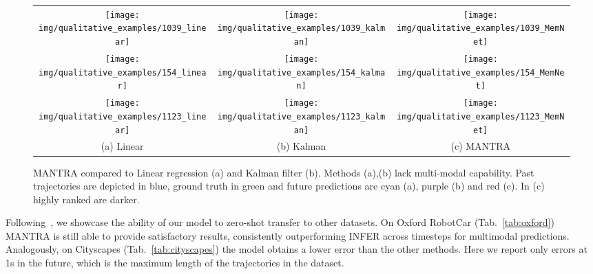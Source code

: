 \documentclass[10pt,twocolumn,letterpaper]{article}
\begin{document}
\newcommand{\qualw}{.26\textwidth}
\begin{figure*}
	\centering
	\begin{tabular}{ccc}
		\texttt{[image: img/qualitative\_examples/1039\_linear]} &
		\texttt{[image: img/qualitative\_examples/1039\_kalman]} &
		\texttt{[image: img/qualitative\_examples/1039\_MemNet]}\\
		
		\texttt{[image: img/qualitative\_examples/154\_linear]} &
		\texttt{[image: img/qualitative\_examples/154\_kalman]} &
		\texttt{[image: img/qualitative\_examples/154\_MemNet]}\\
		
		\texttt{[image: img/qualitative\_examples/1123\_linear]} &
		\texttt{[image: img/qualitative\_examples/1123\_kalman]} &
		\texttt{[image: img/qualitative\_examples/1123\_MemNet]}\\
		(a) Linear & (b) Kalman & (c) MANTRA\\
		
	\end{tabular}	
	\caption{MANTRA compared to Linear regression (a) and Kalman filter (b).  Methods (a),(b)  lack multi-modal capability. Past trajectories are depicted in blue, ground truth in green and future predictions are cyan (a), purple (b) and red (c). In (c) highly ranked are darker. \label{fig:qualitative}}
\end{figure*}

Following~\cite{srikanth2019infer}, we showcase the ability of our model to zero-shot transfer to other datasets. On Oxford RobotCar (Tab.~\ref{tab:oxford}) MANTRA is still able to provide satisfactory results, consistently outperforming INFER across timesteps for multimodal predictions. Analogously, on Cityscapes (Tab.~\ref{tab:cityscapes}) the model obtains a lower error than the other methods. Here we report only errors at 1s in the future, which is the maximum length of the trajectories in the dataset.
\end{document}
